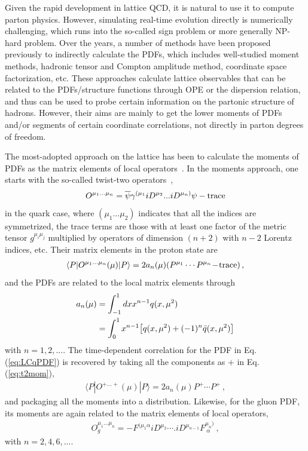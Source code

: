 Given the rapid development in lattice QCD, it is natural to use it
to compute parton physics. However, simulating real-time evolution directly
is numerically challenging, which runs into the so-called sign problem or more
generally NP-hard problem. Over the years, a number of methods
have been proposed previously to indirectly calculate the PDFs, which
includes well-studied moment methods, hadronic tensor and Compton amplitude method,
coordinate space factorization, etc. These approaches calculate lattice observables that can be related to the PDFs/structure functions through OPE or the dispersion relation, and thus can be used to probe certain information on the partonic structure of hadrons. However, their aims are
mainly to get the lower moments of PDFs and/or
segments of certain coordinate correlations, not directly in parton
degrees of freedom.

The most-adopted approach on the lattice has been to calculate the moments of PDFs
as the matrix elements of local operators~\cite{Kronfeld:1984zv,Martinelli:1987si}.
In the moments approach, one starts with the so-called twist-two operators~\cite{Christ:1972ms},
\begin{align}
	O^{\mu_1...\mu_n}= {\overline \psi}\gamma^{(\mu_1}iD^{\mu_2} ... iD^{\mu_n)} \psi
	- {\rm trace}
	\label{eq:t2opq}
\end{align}
in the quark case, where $(\mu_1...\mu_2)$ indicates that all the indices are symmetrized, the trace terms are those with at least one factor of the metric
tensor $g^{\mu_i \mu_j}$ multiplied by operators of dimension $(n+2)$ with $n-2$ Lorentz indices, etc.
Their matrix elements in the proton state are
\begin{align}
	\langle P|O^{\mu_1...\mu_n}(\mu)|P\rangle =  2a_n(\mu) (P^{\mu_1}\cdots P^{\mu_n} \!-\! {\rm trace}) \,,
	\label{eq:t2mom}
\end{align}
and the PDFs are related to the local matrix elements through
\begin{align}
	{a_n(\mu)} &= { \int^1_{-1} dx x^{n-1} q(x, \mu^2)}\nonumber\\
	&= \int^1_0 x^{n-1} \big[q(x, \mu^2)+(-1)^n \bar q(x, \mu^2)\big]
	\label{eq:t2sum}
\end{align}
with $n=1,2,...$. The time-dependent correlation for the PDF
in Eq. (\ref{eq:LCqPDF}) is recovered by taking all the
components as $+$ in Eq. (\ref{eq:t2mom}),
\begin{align}
	\langle P|O^{+...+}(\mu)|P\rangle =2 a_n(\mu) P^+\cdots P^+ \,,
\end{align}
and packaging all the moments into a distribution.
Likewise, for the gluon PDF, its moments are again related
to the matrix elements of local operators,
\begin{align}
	O_g^{\mu_1...\mu_n} = -F^{(\mu_1\alpha}iD^{\mu_2}\cdots .iD^{\mu_{n-1}}F^{\mu_n)}_{\ \alpha}\ ,
	\label{eq:t2opg}
\end{align}
with $n=2,4,6,...$.

